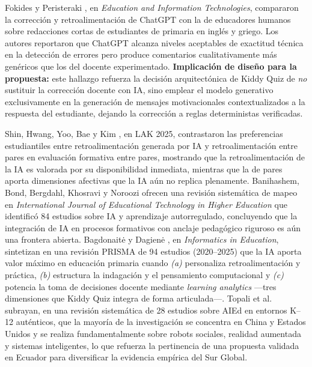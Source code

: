 Fokides y Peristeraki \cite{fokides2025chatgpt}, en \textit{Education and Information Technologies}, compararon la corrección y retroalimentación de ChatGPT con la de educadores humanos sobre redacciones cortas de estudiantes de primaria en inglés y griego. Los autores reportaron que ChatGPT alcanza niveles aceptables de exactitud técnica en la detección de errores pero produce comentarios cualitativamente más genéricos que los del docente experimentado. \textbf{Implicación de diseño para la propuesta:} este hallazgo refuerza la decisión arquitectónica de Kiddy Quiz de \textit{no} sustituir la corrección docente con IA, sino emplear el modelo generativo exclusivamente en la generación de mensajes motivacionales contextualizados a la respuesta del estudiante, dejando la corrección a reglas deterministas verificadas.

Shin, Hwang, Yoo, Bae y Kim \cite{shin2025aigenerated}, en LAK 2025, contrastaron las preferencias estudiantiles entre retroalimentación generada por IA y retroalimentación entre pares en evaluación formativa entre pares, mostrando que la retroalimentación de la IA es valorada por su disponibilidad inmediata, mientras que la de pares aporta dimensiones afectivas que la IA aún no replica plenamente. Banihashem, Bond, Bergdahl, Khosravi y Noroozi \cite{banihashem2025aimapping} ofrecen una revisión sistemática de mapeo en \textit{International Journal of Educational Technology in Higher Education} que identificó 84 estudios sobre IA y aprendizaje autorregulado, concluyendo que la integración de IA en procesos formativos con anclaje pedagógico riguroso es aún una frontera abierta. Bagdonaitė y Dagienė \cite{bagdonaite2025ai}, en \textit{Informatics in Education}, sintetizan en una revisión PRISMA de 94 estudios (2020--2025) que la IA aporta valor máximo en educación primaria cuando \textit{(a)} personaliza retroalimentación y práctica, \textit{(b)} estructura la indagación y el pensamiento computacional y \textit{(c)} potencia la toma de decisiones docente mediante \textit{learning analytics} ---tres dimensiones que Kiddy Quiz integra de forma articulada---. Topali et al.\ \cite{topali2025aied} subrayan, en una revisión sistemática de 28 estudios sobre AIEd en entornos K--12 auténticos, que la mayoría de la investigación se concentra en China y Estados Unidos y se realiza fundamentalmente sobre robots sociales, realidad aumentada y sistemas inteligentes, lo que refuerza la pertinencia de una propuesta validada en Ecuador para diversificar la evidencia empírica del Sur Global.

